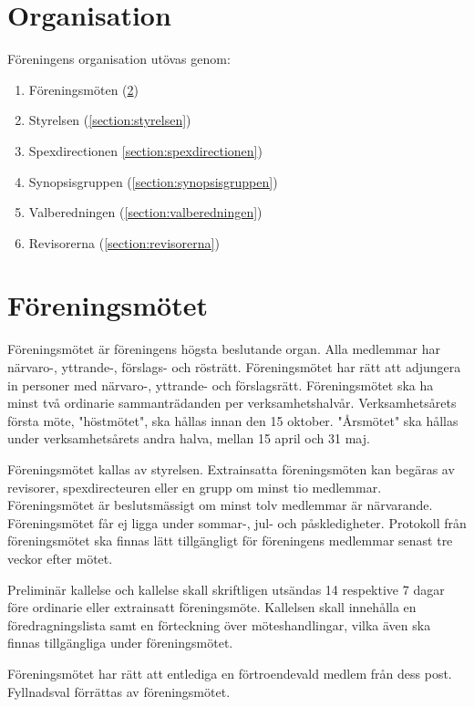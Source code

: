 \documentclass[a4paper]{article}
\begin{document}
\section{Organisation}
Föreningens organisation utövas genom:

\begin{enumerate}
  \item Föreningsmöten (\ref{section:föreningsmötet})
  \item Styrelsen (\ref{section:styrelsen})
  \item Spexdirectionen \ref{section:spexdirectionen})
  \item Synopsisgruppen (\ref{section:synopsisgruppen})
  \item Valberedningen (\ref{section:valberedningen})
  \item Revisorerna (\ref{section:revisorerna})
\end{enumerate}

\section{Föreningsmötet}
\label{section:föreningsmötet}
Föreningsmötet är föreningens högsta beslutande organ. Alla medlemmar har närvaro-, yttrande-, förslags- och rösträtt. Föreningsmötet har rätt att adjungera in personer med närvaro-, yttrande- och förslagsrätt. Föreningsmötet ska ha minst två ordinarie sammanträdanden per verksamhetshalvår. Verksamhetsårets första möte, "höstmötet", ska hållas innan den 15 oktober. "Årsmötet" ska hållas under verksamhetsårets andra halva, mellan 15 april och 31 maj.

Föreningsmötet kallas av styrelsen. Extrainsatta föreningsmöten kan begäras av revisorer, spexdirecteuren eller en grupp om minst tio medlemmar. Föreningsmötet är beslutsmässigt om minst tolv medlemmar är närvarande. Föreningsmötet får ej ligga under sommar-, jul- och påskledigheter. Protokoll från föreningsmötet ska finnas lätt tillgängligt för föreningens medlemmar senast tre veckor efter mötet.

Preliminär kallelse och kallelse skall skriftligen utsändas 14 respektive 7 dagar före ordinarie eller extrainsatt föreningsmöte. Kallelsen skall innehålla en föredragningslista samt en förteckning över möteshandlingar, vilka även ska finnas tillgängliga under föreningsmötet.

Föreningsmötet har rätt att entlediga en förtroendevald medlem från dess post. Fyllnadsval förrättas av föreningsmötet.
\end{document}
